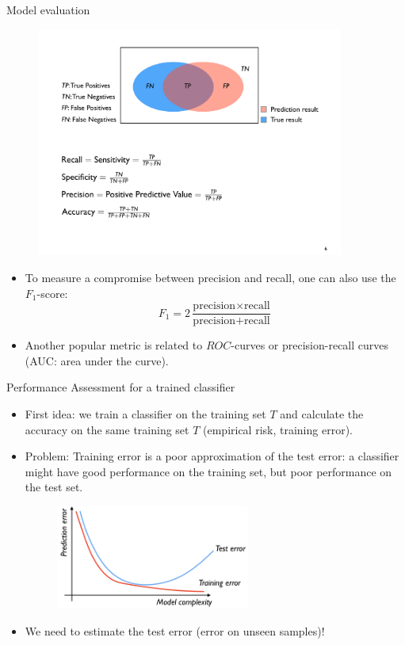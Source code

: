 \documentclass[xcolor=pdftex,dvipsnames,table]{beamer}
\begin{document}
\begin{frame}{Model evaluation }
	\begin{figure}[htb]
		\includegraphics[width=0.9\textwidth]{../graphics/ModelEvaluation.pdf}
	\end{figure}
	\begin{itemize}	
		\item To measure a compromise between precision and recall, one can also use the $F_1$-score:
		\begin{equation}
		F_1 = 2 \frac{\text{precision} \times \text{recall}}{\text{precision} + \text{recall}}
		\end{equation}
		\item Another popular metric is related to $ROC$-curves or precision-recall curves (AUC: area under the curve). 
	\end{itemize}
\end{frame}



\begin{frame}{Performance Assessment for a trained classifier}
	\begin{itemize}
		\item<1-> First idea: we train a classifier on the training set $T$ and calculate the accuracy on the same training set $T$ (empirical risk, training error). 
		\item<2-> Problem: Training error is a poor approximation of the test error: a classifier might have good performance on the training set, but poor performance on the test set.
		\begin{figure}[htb]
			\includegraphics[width=0.6\textwidth]{../graphics/Training_and_test_error.png}
		\end{figure}
		\item<3-> We need to estimate the test error (error on unseen samples)!
	\end{itemize}
\end{frame}
\end{document}
